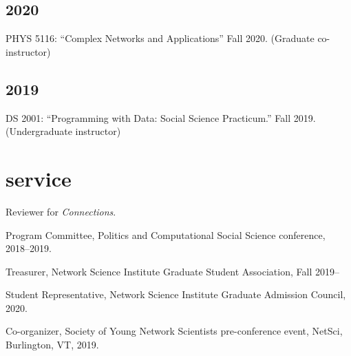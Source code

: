 \documentclass[11pt, letter]{article}
\begin{document}
\subsection{2020}
PHYS 5116: ``Complex Networks and Applications'' Fall 2020. (Graduate co-instructor)

\subsection{2019}
DS 2001: ``Programming with Data: Social Science Practicum.'' Fall 2019. (Undergraduate instructor)
\vspace{2mm}


 \section{service}
 Reviewer for \textit{Connections}.

 Program Committee, Politics and Computational Social Science conference, 2018--2019.

 Treasurer, Network Science Institute Graduate Student Association, Fall 2019--

 Student Representative, Network Science Institute Graduate Admission Council, 2020.

 Co-organizer, Society of Young Network Scientists pre-conference event, NetSci, Burlington, VT, 2019.
\end{document}

